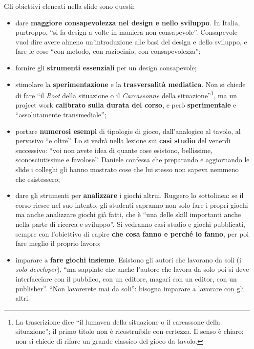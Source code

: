 Gli obiettivi elencati nella slide sono questi:
\begin{itemize}
  \item dare \textbf{maggiore consapevolezza nel design e nello sviluppo}. In
        Italia, purtroppo, ``si fa design a volte in maniera non consapevole''.
        Consapevole vuol dire avere almeno un'introduzione alle basi del design e
        dello sviluppo, e fare le cose ``con metodo, con raziocinio, con
        consapevolezza'';
  \item fornire gli \textbf{strumenti essenziali} per un design consapevole;
  \item stimolare la \textbf{sperimentazione} e la \textbf{trasversalità
        mediatica}. Non si chiede di fare ``il \emph{Root} della situazione o il
        \emph{Carcassonne} della situazione''\footnote{La trascrizione dice ``il
        lumaven della situazione o il carcassone della situazione''; il primo
        titolo non è ricostruibile con certezza. Il senso è chiaro: non si
        chiede di rifare un grande classico del gioco da tavolo.}, ma un
        project work \textbf{calibrato sulla durata del corso}, e però
        \textbf{sperimentale} e ``assolutamente transmediale'';
  \item portare \textbf{numerosi esempi} di tipologie di gioco, dall'analogico al
        tavolo, al pervasivo ``e oltre''. Lo si vedrà nella lezione sui
        \textbf{casi studio} del venerdì successivo: ``voi non avete idea di
        quante cose esistono, bellissime, sconosciutissime e favolose''. Daniele
        confessa che preparando e aggiornando le slide i colleghi gli hanno
        mostrato cose che lui stesso non sapeva nemmeno che esistessero;
  \item dare gli strumenti per \textbf{analizzare} i giochi altrui. Ruggero lo
        sottolinea: se il corso riesce nel suo intento, gli studenti sapranno
        non solo fare i propri giochi ma anche analizzare giochi già fatti, che è
        ``una delle skill importanti anche nella parte di ricerca e sviluppo''.
        Si vedranno casi studio e giochi pubblicati, sempre con l'obiettivo di
        capire \textbf{che cosa fanno e perché lo fanno}, per poi fare meglio il
        proprio lavoro;
  \item imparare a \textbf{fare giochi insieme}. Esistono gli autori che lavorano
        da soli (i \emph{solo developer}), ``ma sappiate che anche l'autore che
        lavora da solo poi si deve interfacciare con il pubblico, con un editore,
        magari con un editor, con un publisher''. ``Non lavorerete mai da soli'':
        bisogna imparare a lavorare con gli altri.
\end{itemize}


